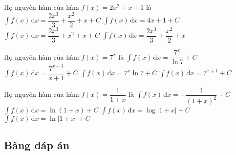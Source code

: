 \begin{ex}%
	Họ nguyên hàm của hàm $f(x) = 2x^2+x+1$ là 
	\choice
	{\True $\displaystyle\int f(x) \mathrm{\,d}x = \dfrac{2x^3}{3}+ \dfrac{x^2}{2} + x+C$}	
	{$\displaystyle\int f(x) \mathrm{\,d}x = 4x+1 + C$}
	{$\displaystyle\int f(x) \mathrm{\,d}x = \dfrac{2x^3}{3}+ x^2 + x + C$}
	{$\displaystyle\int f(x) \mathrm{\,d}x = \dfrac{2x^3}{3} + \dfrac{x^2}{2} + x$}
\end{ex}
\begin{ex}%
	Họ nguyên hàm của hàm $f(x) = 7^{x}$ là 
	\choice
	{\True $\displaystyle\int f(x) \mathrm{\,d}x = \dfrac{7^x}{\ln {7}} +C$}	
	{$\displaystyle\int f(x) \mathrm{\,d}x = \dfrac{7^{x+1}}{x+1}+C$}
	{$\displaystyle\int f(x) \mathrm{\,d}x = 7^x \ln {7} + C$}
	{$\displaystyle\int f(x) \mathrm{\,d}x = 7^{x+1}+C$}
\end{ex}
\begin{ex}%
	Họ nguyên hàm của hàm $f(x) = \dfrac {1}{1+x} $ là 
	\choice
	{$\displaystyle\int f(x) \mathrm{\,d}x = -\dfrac {1}{{\left(1+x\right)}^2} + C$}	
	{$\displaystyle\int f(x) \mathrm{\,d}x = \ln \left(1+x\right) + C$}
	{$\displaystyle\int f(x) \mathrm{\,d}x = \log \left|1+x\right| + C$}
	{\True $\displaystyle\int f(x) \mathrm{\,d}x = \ln \left|1+x\right| + C$}
\end{ex}
\subsection{Bảng đáp án}
